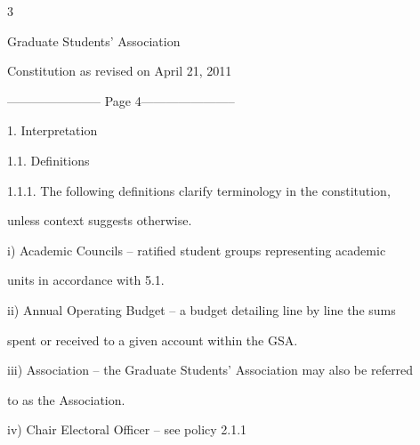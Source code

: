   



  



  



  



  



  



                                                                       

                                                                     3  



                                                Graduate Students’ Association  



                                          Constitution as revised on April 21, 2011  


----------------------- Page 4-----------------------

  



1.  Interpretation  



1.1.         Definitions  



1.1.1. The   following  definitions  clarify   terminology  in   the   constitution,  

        unless  context suggests  otherwise.  



i)      Academic  Councils  –  ratified  student  groups  representing  academic  

        units in accordance with 5.1.  



ii)     Annual  Operating  Budget  –  a  budget  detailing line  by  line  the  sums  

         spent or received to a given account within the GSA.  



iii)    Association – the Graduate Students’ Association may also be referred  

        to as the Association.  



iv)      Chair Electoral Officer – see policy 2.1.1  



